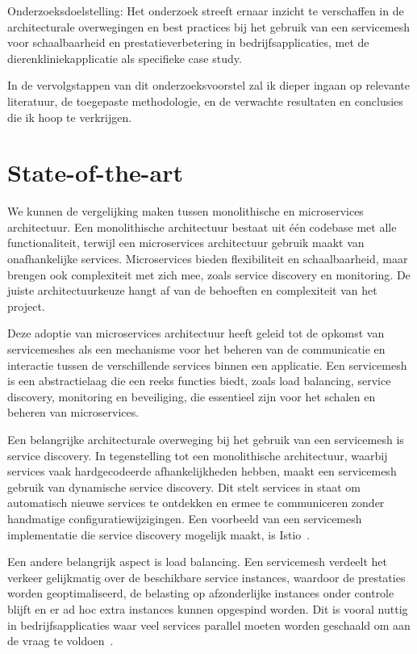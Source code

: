 Onderzoeksdoelstelling: Het onderzoek streeft ernaar inzicht te verschaffen in de architecturale overwegingen en best practices bij het gebruik van een servicemesh voor schaalbaarheid en prestatieverbetering in bedrijfsapplicaties, met de dierenkliniekapplicatie als specifieke case study.

In de vervolgstappen van dit onderzoeksvoorstel zal ik dieper ingaan op relevante literatuur, de toegepaste methodologie, en de verwachte resultaten en conclusies die ik hoop te verkrijgen.

\section{State-of-the-art}%
\label{sec:state-of-the-art}

We kunnen de vergelijking maken  tussen monolithische en microservices architectuur. Een monolithische architectuur bestaat uit één codebase met alle functionaliteit, terwijl een \linebreak microservices architectuur gebruik maakt van onafhankelijke services. Microservices bieden flexibiliteit en schaalbaarheid, maar brengen ook complexiteit met zich mee, zoals service discovery en monitoring. De juiste architectuurkeuze hangt af van de behoeften en complexiteit van het project.

Deze adoptie van microservices architectuur heeft geleid tot de opkomst van servicemeshes als een mechanisme voor het beheren van de communicatie en interactie tussen de verschillende services binnen een applicatie. Een servicemesh is een abstractielaag die een reeks functies biedt, zoals load balancing, service discovery, monitoring en beveiliging, die essentieel zijn voor het schalen en beheren van microservices.

Een belangrijke architecturale overweging bij het gebruik van een servicemesh is service discovery. In tegenstelling tot een monolithische architectuur, waarbij services vaak hardgecodeerde afhankelijkheden hebben, maakt een servicemesh gebruik van dynamische service discovery. Dit stelt services in staat om automatisch nieuwe services te ontdekken en ermee te communiceren zonder handmatige configuratiewijzigingen. Een voorbeeld van een servicemesh implementatie die service discovery mogelijk maakt, is Istio\linebreak~\autocite{Morgan2021}.

Een andere belangrijk aspect is load balancing. Een servicemesh verdeelt het verkeer gelijkmatig over de beschikbare service instances, waardoor de prestaties worden geoptimaliseerd, de belasting op afzonderlijke instances onder controle blijft en er ad hoc extra instances kunnen opgespind worden. Dit is vooral nuttig in bedrijfsapplicaties waar veel services parallel moeten worden geschaald om aan de vraag te voldoen~\autocite{Ciobotaru2020}.

